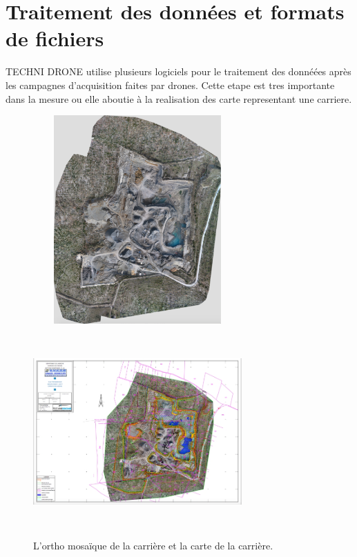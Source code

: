 \section{Traitement des données et formats de fichiers}

TECHNI DRONE utilise plusieurs logiciels pour le traitement des donnéées après
les campagnes d'acquisition faites par drones. Cette etape est tres importante 
dans la mesure ou elle aboutie à la realisation des carte representant une carriere.

\begin{figure}[h]
  \begin{minipage}[c]{.46\linewidth}
      \centering
      \includegraphics[width=8cm, height=8cm]{images/orthomosaique.png}
  \end{minipage}
  \hfill%
  \begin{minipage}[c]{.46\linewidth}
      \centering
      \includegraphics[width=8cm,height=8cm]{images/carteCarriere.jpg}
  \end{minipage}
  \caption{L’ortho mosaïque de la carrière et la carte de la carrière.
     \label{fig:credit}}
\end{figure}


